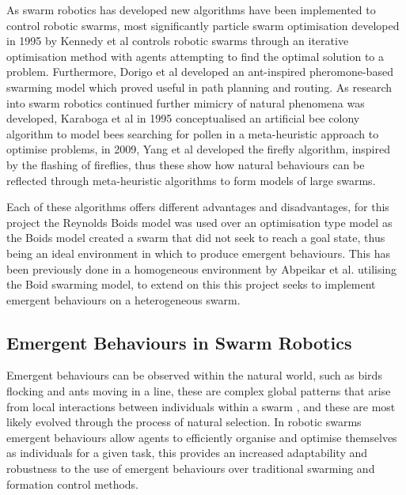 \documentclass[conference]{IEEEtran}
\begin{document}
As swarm robotics has developed new algorithms have been implemented to control robotic swarms, most significantly particle swarm optimisation developed in 1995 by Kennedy et al \cite{kennedy_particle_1995} controls robotic swarms through an iterative optimisation method with agents attempting to find the optimal solution to a problem. Furthermore, Dorigo et al \cite{dorigo_ant_1999} developed an ant-inspired pheromone-based swarming model which proved useful in path planning and routing. As research into swarm robotics continued further mimicry of natural phenomena was developed, Karaboga et al \cite{karaboga_idea_2005} in 1995 conceptualised an artificial bee colony algorithm to model bees searching for pollen in a meta-heuristic approach to optimise problems, in 2009, Yang et al \cite{yang_firefly_2009} developed the firefly algorithm, inspired by the flashing of fireflies, thus these show how natural behaviours can be reflected through meta-heuristic algorithms to form models of large swarms.

Each of these algorithms offers different advantages and disadvantages, for this project the Reynolds Boids model was used over an optimisation type model as the Boids model created a swarm that did not seek to reach a goal state, thus being an ideal environment in which to produce emergent behaviours. This has been previously done in a homogeneous environment by Abpeikar et al. \cite{abpeikar_iterative_2023} utilising the Boid swarming model, to extend on this this project seeks to implement emergent behaviours on a heterogeneous swarm. 

\subsection{Emergent Behaviours in Swarm Robotics}

Emergent behaviours can be observed within the natural world, such as birds flocking and ants moving in a line, these are complex global patterns that arise from local interactions between individuals within a swarm \cite{di_marzo_serugendo_self-organisation_2004}, and these are most likely evolved through the process of natural selection. In robotic swarms emergent behaviours allow agents to efficiently organise and optimise themselves as individuals for a given task, this provides an increased adaptability and robustness to the use of emergent behaviours over traditional swarming and formation control methods. 
\end{document}
